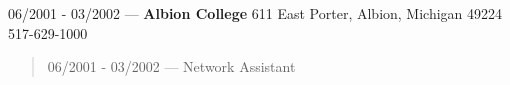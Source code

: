 06/2001 - 03/2002 --- {\bf Albion College} 611 East Porter, Albion, Michigan 49224 517-629-1000
\begin{quote}
06/2001 - 03/2002 --- Network Assistant
\end{quote}
